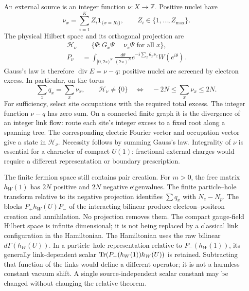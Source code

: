 An external source is an integer function $\nu:X\to\mathbb Z$.
Positive nuclei have
\begin{equation}
 \nu_x=\sum_{i=1}^K Z_i\mathbf1_{\{x=R_i\}},\qquad
 Z_i\in\{1,\ldots,Z_{\max}\}.
 \label{lat-sources}
\end{equation}
The physical Hilbert space and its orthogonal projection are
\begin{align}
 \mathcal H_\nu&=\{\Psi:G_x\Psi=\nu_x\Psi\text{ for all }x\},\nonumber\\
 P_\nu&=\int_{[0,2\pi)^N}\frac{d\theta}{(2\pi)^N}
            e^{-i\sum_x\theta_x\nu_x}W(e^{i\theta}).
 \label{lat-projection}
\end{align}
Gauss's law is therefore
$\operatorname{div}E=\nu-q$: positive nuclei are screened by electron
excess.  In particular, on the torus
\begin{equation}
 \sum_xq_x=\sum_x\nu_x,\qquad
 \mathcal H_\nu\ne\{0\}\quad\Longleftrightarrow\quad
             -2N\le\sum_x\nu_x\le2N.
 \label{lat-capacity}
\end{equation}
For sufficiency, select site occupations with the required total excess.
The integer function $\nu-q$ has zero sum.  On a connected finite graph
it is the divergence of an integer link flow: route each site's integer
excess to a fixed root along a spanning tree.  The corresponding electric
Fourier vector and occupation vector give a state in $\mathcal H_\nu$.
Necessity follows by summing Gauss's law.  Integrality of $\nu$ is
essential for a character of compact $U(1)$; fractional external charges
would require a different representation or boundary prescription.

The finite fermion space still contains pair creation.  For $m>0$, the
free matrix $h_W(1)$ has $2N$ positive and $2N$ negative eigenvalues.
The finite particle--hole transform relative to its negative projection
identifies $\sum q_x$ with $N_e-N_p$.  The blocks
$P_+h_W(U)P_-$ of the interacting bilinear produce electron--positron
creation and annihilation.  No projection removes them.  The compact
gauge-field Hilbert space is infinite dimensional; it is not being
replaced by a classical link configuration in the Hamiltonian.
The Hamiltonian uses the raw bilinear \(d\Gamma(h_W(U))\).
In a particle--hole representation relative to \(P_-(h_W(1))\), its
generally link-dependent scalar
\(\operatorname{Tr}(P_-(h_W(1))h_W(U))\) is retained. Subtracting that function
of the links would define a different operator; it is not a harmless
constant vacuum shift. A single source-independent scalar constant
may be changed without changing the relative theorem.

